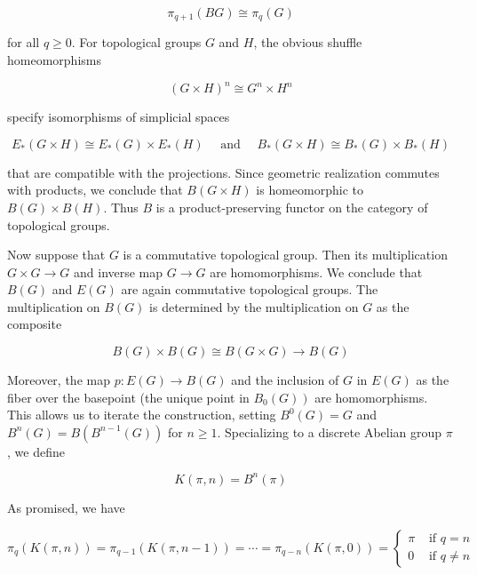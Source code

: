 $$
\pi_{q+1}(B G) \cong \pi_q(G)
$$

for all $q \geq 0$.
For topological groups $G$ and $H$, the obvious shuffle homeomorphisms

$$
(G \times H)^n \cong G^n \times H^n
$$

specify isomorphisms of simplicial spaces

$$
E_*(G \times H) \cong E_*(G) \times E_*(H) \quad \text { and } \quad B_*(G \times H) \cong B_*(G) \times B_*(H)
$$

that are compatible with the projections. Since geometric realization commutes with products, we conclude that $B(G \times H)$ is homeomorphic to $B(G) \times B(H)$. Thus $B$ is a product-preserving functor on the category of topological groups.

Now suppose that $G$ is a commutative topological group. Then its multiplication $G \times G \longrightarrow G$ and inverse map $G \longrightarrow G$ are homomorphisms. We conclude that $B(G)$ and $E(G)$ are again commutative topological groups. The multiplication on $B(G)$ is determined by the multiplication on $G$ as the composite

$$
B(G) \times B(G) \cong B(G \times G) \longrightarrow B(G)
$$


Moreover, the map $p: E(G) \longrightarrow B(G)$ and the inclusion of $G$ in $E(G)$ as the fiber over the basepoint (the unique point in $\left.B_0(G)\right)$ are homomorphisms. This allows us to iterate the construction, setting $B^0(G)=G$ and $B^n(G)=B\left(B^{n-1}(G)\right)$ for $n \geq 1$. Specializing to a discrete Abelian group $\pi$, we define

$$
K(\pi, n)=B^n(\pi)
$$


As promised, we have

$$
\pi_q(K(\pi, n))=\pi_{q-1}(K(\pi, n-1))=\cdots=\pi_{q-n}(K(\pi, 0))= \begin{cases}\pi & \text { if } q=n \\ 0 & \text { if } q \neq n\end{cases}
$$





